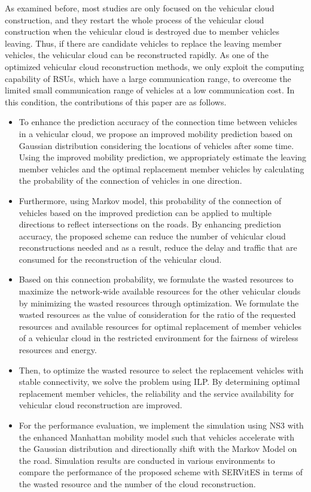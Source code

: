 \documentclass[electronics,aricle,accept,pdftex,moreauthors]{Definitions/mdpi}
\begin{document}
As examined before, most studies are only focused on the vehicular cloud construction, and they restart the whole process of the vehicular cloud construction when the vehicular cloud is destroyed due to member vehicles leaving. 
Thus, if there are candidate vehicles to replace the leaving member vehicles, the vehicular cloud can be reconstructed rapidly. 
As one of the optimized vehicular cloud reconstruction methods, we only exploit the computing capability of RSUs, which have a large communication range, to overcome the limited small communication range of vehicles at a low communication cost.
In this condition, the contributions of this paper are as follows.
\begin{itemize}
    \item To enhance the prediction accuracy of the connection time between vehicles in a vehicular cloud, we propose an improved mobility prediction based on Gaussian distribution considering the locations of vehicles after some time.
    Using the improved mobility prediction, we appropriately estimate the leaving member vehicles and the optimal replacement member vehicles by calculating the probability of the connection of vehicles in one direction.
    \item Furthermore, using Markov model, this probability of the connection of vehicles based on the improved prediction can be applied to multiple directions to reflect intersections on the roads.
    By enhancing prediction accuracy, the proposed scheme can reduce the number of vehicular cloud reconstructions needed and as a result, reduce the delay and traffic that are consumed for the reconstruction of the vehicular cloud.
    \item Based on this connection probability, we formulate the wasted resources to maximize the network-wide available resources for the other vehicular clouds by minimizing the wasted resources through optimization.
    We formulate the wasted resources as the value of consideration for the ratio of the requested resources and available resources for optimal replacement of member vehicles of a vehicular cloud in the restricted environment for the fairness of wireless resources and energy.
    \item Then, to optimize the wasted resource to select the replacement vehicles with stable connectivity, we solve the problem using ILP.
    By determining optimal replacement member vehicles, the reliability and the service availability for vehicular cloud reconstruction are improved.
    \item For the performance evaluation, we implement the simulation using NS3 with the enhanced Manhattan mobility model such that vehicles accelerate with the Gaussian distribution and directionally shift with the Markov Model on the road.
    Simulation results are conducted in various environments to compare the performance of the proposed scheme with SERVitES in terms of the wasted resource and the number of the cloud reconstruction.
\end{itemize}
\end{document}
